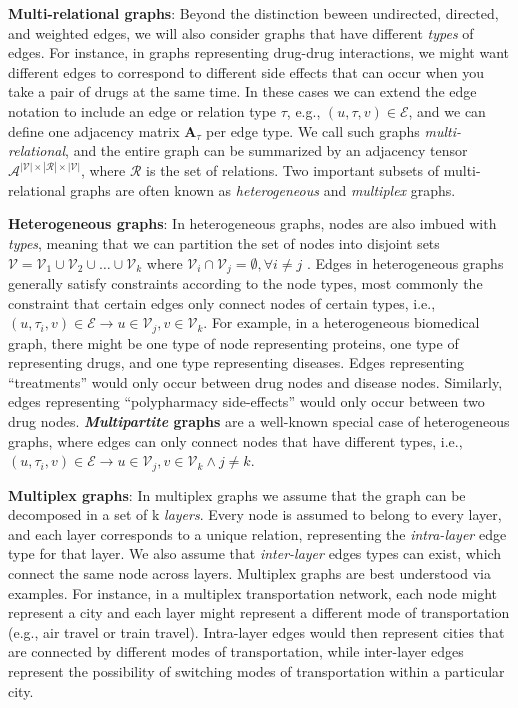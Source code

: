 \documentclass{article}
\begin{document}
\begin{itemize}
\begin{displayquote}
\textbf{Multi-relational graphs}: Beyond the distinction beween undirected, directed, and weighted edges, we will also consider graphs that have different \textit{types} of edges. For instance, in graphs representing drug-drug interactions, we might want different edges to correspond to different side effects that can occur when you take a pair of drugs at the same time. In these cases we can extend the edge notation to include an edge or relation type $ \tau $, e.g., $ (u, \tau, v) \in \mathcal{E} $, and we can define one adjacency matrix $ \mathbf{A}_{\tau} $ per edge type. We call such graphs \textit{multi-relational}, and the entire graph can be summarized by an adjacency tensor $ \mathcal{A}^{|\mathcal{V}| \times |\mathcal{R}| \times |\mathcal{V}|} $, where $ \mathcal{R} $ is the set of relations. Two important subsets of multi-relational graphs are often known as \textit{heterogeneous} and \textit{multiplex} graphs.

\textbf{Heterogeneous graphs}: In heterogeneous graphs, nodes are also imbued with \textit{types}, meaning that we can partition the set of nodes into disjoint sets $ \mathcal{V} = \mathcal{V}_1 \cup \mathcal{V}_2 \cup \ldots \cup \mathcal{V}_k $ where $ \mathcal{V}_i \cap \mathcal{V}_j = \emptyset, \forall i \ne j $ . Edges in heterogeneous graphs generally satisfy constraints according to the node types, most commonly the constraint that certain edges only connect nodes of certain types, i.e., $ (u, \tau_i, v) \in \mathcal{E} \rightarrow u \in \mathcal{V}_j, v \in \mathcal{V}_k $. For example, in a heterogeneous biomedical graph, there might be one type of node representing proteins, one type of representing drugs, and one type representing diseases. Edges representing “treatments” would only occur between drug nodes and disease nodes. Similarly, edges representing “polypharmacy side-effects” would only occur between two drug nodes. \textbf{\textit{Multipartite} graphs} are a well-known special case of heterogeneous graphs, where edges can only connect nodes that have different types, i.e., $ (u, \tau_i, v) \in \mathcal{E} \rightarrow u \in \mathcal{V}_j, v \in \mathcal{V}_k \wedge j \ne k $.

\textbf{Multiplex graphs}: In multiplex graphs we assume that the graph can be decomposed in a set of k \textit{layers}. Every node is assumed to belong to every layer, and each layer corresponds to a unique relation, representing the \textit{intra-layer} edge type for that layer. We also assume that \textit{inter-layer} edges types can exist, which connect the same node across layers. Multiplex graphs are best understood via examples. For instance, in a multiplex transportation network, each node might represent a city and each layer might represent a different mode of transportation (e.g., air travel or train travel). Intra-layer edges would then represent cities that are connected by different modes of transportation, while inter-layer edges represent the possibility of switching modes of transportation within a particular city.


\end{displayquote}
\end{itemize}
\end{document}
